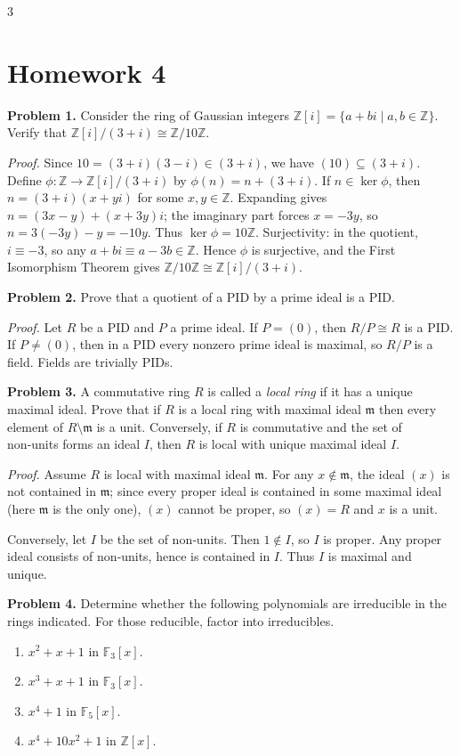 \documentclass[10pt,landscape]{article}
\begin{document}
\begin{multicols}{3}
\section*{Homework 4}

\noindent\textbf{Problem 1.} Consider the ring of Gaussian integers \(\mathbb{Z}[i]=\{a+bi\mid a,b\in\mathbb{Z}\}\). Verify that \(\mathbb{Z}[i]/(3+i)\cong\mathbb{Z}/10\mathbb{Z}\).

\textit{Proof.} Since \(10=(3+i)(3-i)\in(3+i)\), we have \((10)\subseteq(3+i)\). Define \(\phi:\mathbb{Z}\to\mathbb{Z}[i]/(3+i)\) by \(\phi(n)=n+(3+i)\). If \(n\in\ker\phi\), then \(n=(3+i)(x+yi)\) for some \(x,y\in\mathbb{Z}\). Expanding gives \(n=(3x-y)+(x+3y)i\); the imaginary part forces \(x=-3y\), so \(n=3(-3y)-y=-10y\). Thus \(\ker\phi=10\mathbb{Z}\). Surjectivity: in the quotient, \(i\equiv-3\), so any \(a+bi\equiv a-3b\in\mathbb{Z}\). Hence \(\phi\) is surjective, and the First Isomorphism Theorem gives \(\mathbb{Z}/10\mathbb{Z}\cong\mathbb{Z}[i]/(3+i)\). 

\noindent\textbf{Problem 2.} Prove that a quotient of a PID by a prime ideal is a PID.

\textit{Proof.} Let \(R\) be a PID and \(P\) a prime ideal. If \(P=(0)\), then \(R/P\cong R\) is a PID. If \(P\neq(0)\), then in a PID every nonzero prime ideal is maximal, so \(R/P\) is a field. Fields are trivially PIDs.

\noindent\textbf{Problem 3.} A commutative ring \(R\) is called a \emph{local ring} if it has a unique maximal ideal. Prove that if \(R\) is a local ring with maximal ideal \(\mathfrak{m}\) then every element of \(R\setminus\mathfrak{m}\) is a unit. Conversely, if \(R\) is commutative and the set of non‑units forms an ideal \(I\), then \(R\) is local with unique maximal ideal \(I\).

\textit{Proof.} Assume \(R\) is local with maximal ideal \(\mathfrak{m}\). For any \(x\notin\mathfrak{m}\), the ideal \((x)\) is not contained in \(\mathfrak{m}\); since every proper ideal is contained in some maximal ideal (here \(\mathfrak{m}\) is the only one), \((x)\) cannot be proper, so \((x)=R\) and \(x\) is a unit.

Conversely, let \(I\) be the set of non‑units. Then \(1\notin I\), so \(I\) is proper. Any proper ideal consists of non‑units, hence is contained in \(I\). Thus \(I\) is maximal and unique.

\noindent\textbf{Problem 4.} Determine whether the following polynomials are irreducible in the rings indicated. For those reducible, factor into irreducibles.
\begin{enumerate}
\item \(x^{2}+x+1\) in \(\mathbb{F}_3[x]\).
\item \(x^{3}+x+1\) in \(\mathbb{F}_3[x]\).
\item \(x^{4}+1\) in \(\mathbb{F}_5[x]\).
\item \(x^{4}+10x^{2}+1\) in \(\mathbb{Z}[x]\).
\end{enumerate}


\end{multicols}
\end{document}
